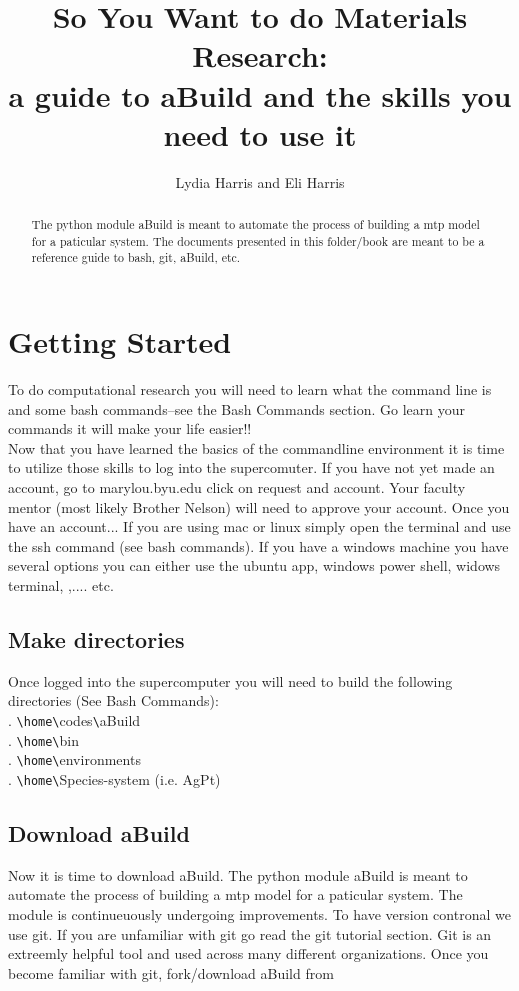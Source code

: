 \documentclass{article}
\title{So You Want to do Materials Research:\\[0.02em]\smaller{}a
guide to aBuild and the skills you need to use it}
\author{Lydia Harris and Eli Harris}
\begin{document}
\maketitle
\begin{abstract}
 The python module aBuild is meant to automate the process of
 building a mtp model for a paticular system. The documents presented
 in this folder/book are meant to be a reference guide to bash, git, aBuild, etc.
\end{abstract}

\section{Getting Started}
To do computational research you will need to learn what the command
line is and some bash commands--see the Bash Commands section. Go
learn your commands it will make your life easier!!\\
Now that you have learned the basics of the commandline environment it
is time to utilize those skills to log into the supercomuter. If you
have not yet made an account, go to marylou.byu.edu click on request
and account. Your faculty mentor (most likely Brother Nelson) will
need to approve your account. Once you have an account...
If you are using mac or linux simply open the terminal and use the ssh
command (see bash commands).  If you have a windows machine you have
several options you can either use the ubuntu app, windows power
shell, widows terminal, ,.... etc.

\subsection{Make directories}
Once logged into the supercomputer you will need to build the
following directories (See Bash Commands):\\
. \verb|\home\|codes\verb|\|aBuild\\
. \verb|\home\|bin\\
. \verb|\home\|environments\\
. \verb|\home\|Species-system (i.e. AgPt) 

\subsection{Download aBuild}
Now it is time to download aBuild. The python module aBuild is meant
to automate the process of building a mtp model for a paticular
system. The module is continueuously undergoing improvements. To have
version contronal we use git. If you are unfamiliar with git go read
the git tutorial section. Git is an extreemly helpful tool and used
across many different organizations. Once you become familiar with
git, fork/download aBuild from 
\end{document}
